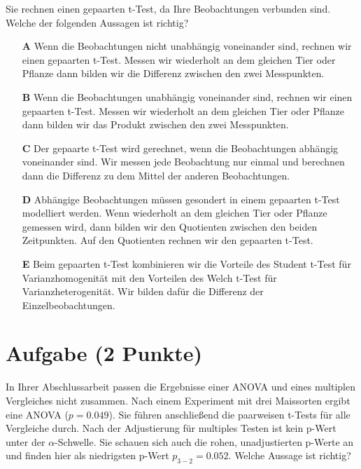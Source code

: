 \documentclass[a4paper, 9pt]{scrartcl}\usepackage[]{graphicx}\usepackage[]{xcolor}
\begin{document}
Sie rechnen einen gepaarten t-Test, da Ihre Beobachtungen verbunden sind. Welche der folgenden Aussagen ist richtig?



\begin{enumerate}
\item [\textbf{A} \msquare] Wenn die Beobachtungen nicht unabhängig voneinander sind, rechnen wir einen gepaarten t-Test. Messen wir wiederholt an dem gleichen Tier oder Pflanze dann bilden wir die Differenz zwischen den zwei Messpunkten.
\item [\textbf{B} \msquare] Wenn die Beobachtungen unabhängig voneinander sind, rechnen wir einen gepaarten t-Test. Messen wir wiederholt an dem gleichen Tier oder Pflanze dann bilden wir das Produkt zwischen den zwei Messpunkten.
\item [\textbf{C} \msquare] Der gepaarte t-Test wird gerechnet, wenn die Beobachtungen abhängig voneinander sind. Wir messen jede Beobachtung nur einmal und berechnen dann die Differenz zu dem Mittel der anderen Beobachtungen.
\item [\textbf{D} \msquare] Abhängige Beobachtungen müssen gesondert in einem gepaarten t-Test modelliert werden. Wenn wiederholt an dem gleichen Tier oder Pflanze gemessen wird, dann bilden wir den Quotienten zwischen den beiden Zeitpunkten. Auf den Quotienten rechnen wir den gepaarten t-Test.
\item [\textbf{E} \msquare] Beim gepaarten t-Test kombinieren wir die Vorteile des Student t-Test für Varianzhomogenität mit den Vorteilen des Welch t-Test für Varianzheterogenität. Wir bilden dafür die Differenz der Einzelbeobachtungen.
\end{enumerate}

\section{Aufgabe \hfill (2 Punkte)}



In Ihrer Abschlussarbeit passen die Ergebnisse einer ANOVA und eines multiplen Vergleiches nicht zusammen. Nach einem Experiment mit drei Maissorten ergibt eine ANOVA ($p = 0.049$). Sie führen anschließend die paarweisen t-Tests für alle Vergleiche durch. Nach der Adjustierung für multiples Testen ist kein p-Wert unter der $\alpha$-Schwelle. Sie schauen sich auch die rohen, unadjustierten p-Werte an und finden hier als niedrigsten p-Wert $p_{3-2} = 0.052$. Welche Aussage ist richtig?
\end{document}
